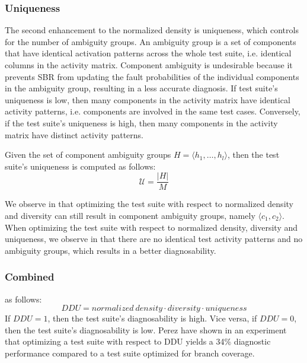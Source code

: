 \documentclass[twoside,a4paper,11pt]{memoir}
\begin{document}
\subsubsection{Uniqueness}
The second enhancement to the normalized density is uniqueness, which controls for the number of ambiguity groups.
An ambiguity group is a set of components that have identical activation patterns across the whole test suite, i.e. identical columns in the activity matrix.
Component ambiguity is undesirable because it prevents SBR from updating the fault probabilities of the individual components in the ambiguity group, resulting in a less accurate diagnosis.
If test suite's uniqueness is low, then many components in the activity matrix have identical activity patterns, i.e. components are involved in the same test cases.
Conversely, if the test suite's uniqueness is high, then many components in the activity matrix have distinct activity patterns.

Given the set of component ambiguity groups $H = \langle h_1, \dots, h_l \rangle$, then the test suite's uniqueness is computed as follows:
\begin{equation}
  \mathcal{U} = \frac{|H|}{M}
\end{equation}

We observe in  that optimizing the test suite with respect to normalized density and diversity can still result in component ambiguity groups, namely $\langle c_1, c_2 \rangle$.
When optimizing the test suite with respect to normalized density, diversity and uniqueness, we observe in  that there are no identical test activity patterns and no ambiguity groups, which results in a better diagnosability.

\subsubsection{Combined}
as follows:
\begin{equation}
 DDU = normalized\ density \cdot diversity \cdot uniqueness
\end{equation}
If $DDU = 1$, then the test suite's diagnosability is high.
Vice versa, if $DDU = 0$, then the test suite's diagnosability is low.
Perez \etal \cite{DBLP:conf/icse/PerezAD17} have shown in an experiment that optimizing a test suite with respect to DDU yields a 34\% diagnostic performance compared to a test suite optimized for branch coverage.
\end{document}
